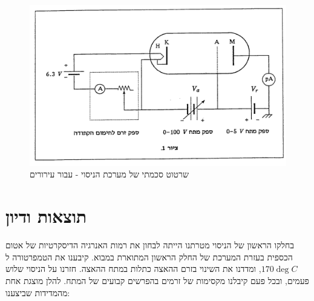 \documentclass{article}
\begin{document}
\begin{figure}[H]
	\centering
	\includegraphics[width=\textwidth]{./system-scheme-excitations.png}
	\caption{שרטוט סכמתי של מערכת הניסוי - עבור עירורים}
	\label{fig:system-scheme-excitations}
\end{figure}

\section{תוצאות ודיון}
בחלקו הראשון של הניסוי מטרתנו הייתה לבחון את רמות האנרגיה הדיסקרטיות של אטום הכספית בעזרת המערכת של החלק הראשון המתוארת במבוא.
קיבענו את הטמפרטורה ל
$170 \deg C$,
ומדדנו את השינוי בזרם ההאצה כתלות במתח ההאצה.
חזרנו על הניסוי שלוש פעמים, ובכל פעם קיבלנו מקסימות של זרמים בהפרשים קבועים של המתח.
להלן מוצגת אחת מהמדידות שביצענו:

\begin{figure}[H]
	\begin{center}
	\resizebox{\textwidth}{!}{}
	\end{center}
\end{figure}



\end{document}
